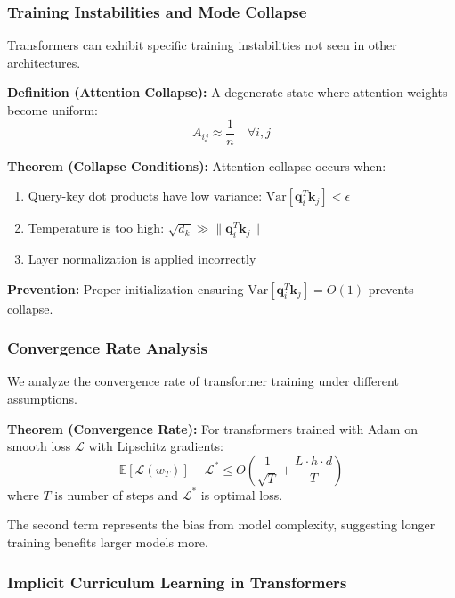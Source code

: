 \subsubsection{Training Instabilities and Mode Collapse}

Transformers can exhibit specific training instabilities not seen in other architectures.

\textbf{Definition (Attention Collapse):} A degenerate state where attention weights become uniform:
\begin{equation}
A_{ij} \approx \frac{1}{n} \quad \forall i,j
\end{equation}

\textbf{Theorem (Collapse Conditions):} Attention collapse occurs when:
\begin{enumerate}
    \item Query-key dot products have low variance: $\text{Var}[\mathbf{q}_i^T\mathbf{k}_j] < \epsilon$
    \item Temperature is too high: $\sqrt{d_k} \gg \|\mathbf{q}_i^T\mathbf{k}_j\|$
    \item Layer normalization is applied incorrectly
\end{enumerate}

\textbf{Prevention:} Proper initialization ensuring $\text{Var}[\mathbf{q}_i^T\mathbf{k}_j] = O(1)$ prevents collapse.

\subsubsection{Convergence Rate Analysis}

We analyze the convergence rate of transformer training under different assumptions.

\textbf{Theorem (Convergence Rate):} For transformers trained with Adam on smooth loss $\mathcal{L}$ with Lipschitz gradients:
\begin{equation}
\mathbb{E}[\mathcal{L}(w_T)] - \mathcal{L}^* \leq O\left(\frac{1}{\sqrt{T}} + \frac{L \cdot h \cdot d}{T}\right)
\end{equation}
where $T$ is number of steps and $\mathcal{L}^*$ is optimal loss.

The second term represents the bias from model complexity, suggesting longer training benefits larger models more.

\subsubsection{Implicit Curriculum Learning in Transformers}

